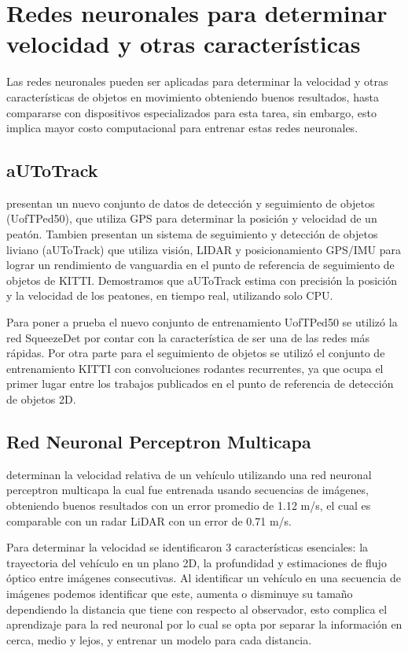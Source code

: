 \section{Redes neuronales para determinar velocidad y otras características}

Las redes neuronales pueden ser aplicadas para determinar la velocidad y otras características de objetos en movimiento obteniendo buenos resultados, hasta compararse con dispositivos especializados para esta tarea, sin embargo, esto implica mayor costo computacional para entrenar estas redes neuronales.

\subsection{aUToTrack}

\cite{burnett2020aUToTrack} presentan un nuevo conjunto de datos de detección y seguimiento de objetos (UofTPed50), que utiliza GPS para determinar la posición y velocidad de un peatón. Tambien presentan un sistema de seguimiento y detección de objetos liviano (aUToTrack) que utiliza visión, LIDAR y posicionamiento GPS/IMU para lograr un rendimiento de vanguardia en el punto de referencia de seguimiento de objetos de KITTI. Demostramos que aUToTrack estima con precisión la posición y la velocidad de los peatones, en tiempo real, utilizando solo CPU.

Para poner a prueba el nuevo conjunto de entrenamiento UofTPed50 se utilizó la red SqueezeDet por contar con la característica de ser una de las redes más rápidas. Por otra parte para el seguimiento de objetos se utilizó el conjunto de entrenamiento KITTI con convoluciones rodantes recurrentes, ya que ocupa el primer lugar entre los trabajos publicados en el punto de referencia de detección de objetos 2D.

\subsection{Red Neuronal Perceptron Multicapa}

\cite{kampelmuhler2018Camera} determinan la velocidad relativa de un vehículo utilizando una red neuronal perceptron multicapa la cual fue entrenada usando secuencias de imágenes, obteniendo buenos resultados con un error promedio de 1.12 m/s, el cual es comparable con un radar  LiDAR con un error de 0.71 m/s.

Para determinar la velocidad se identificaron 3 características esenciales: la trayectoria del vehículo en un plano 2D, la profundidad y estimaciones de flujo óptico entre imágenes consecutivas. Al identificar un vehículo en una secuencia de imágenes podemos identificar que este, aumenta o disminuye su tamaño dependiendo la distancia que tiene con respecto al observador, esto complica el aprendizaje para la red neuronal por lo cual se opta por separar la información en cerca, medio y lejos, y entrenar un modelo para cada distancia.

